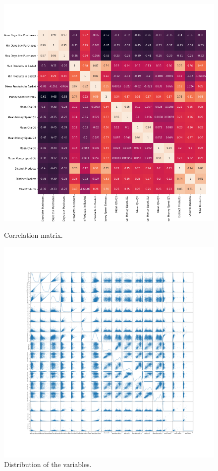 \documentclass[12pt]{article}
\begin{document}
\begin{figure}[H]

    \includegraphics[scale=0.3]{images/figure_correlation_matrix_behavior(1).png}
    \caption{Correlation matrix.}
    \label{fig:kmeans_7}
    \endminipage\hfill
{}
    \includegraphics[scale=0.1]{images/figure_scatter_matrix_behavior.png}
    \caption{Distribution of the variables.}
     \label{fig:distribution_variables}

    \endminipage\hfill

\label{fig:insieme}
\end{figure}
\end{document}
